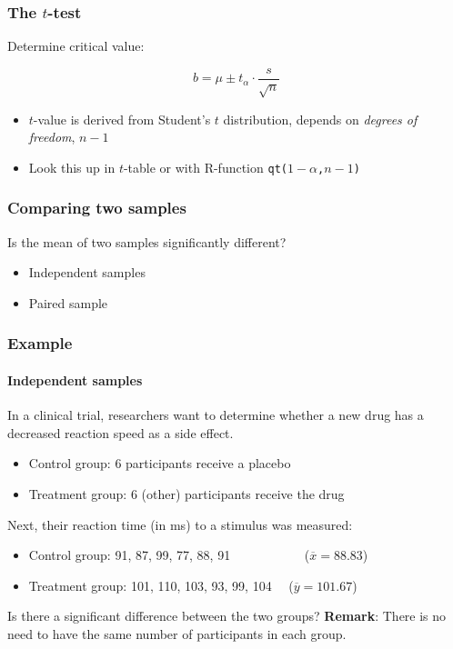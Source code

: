 \documentclass{beamer}
\begin{document}
\begin{frame}
  \frametitle{The $t$-test}
  
  Determine critical value:
  
  \[ b = \mu \pm t_\alpha \cdot \frac{s}{\sqrt{n}} \]
  
  \begin{itemize}
    \item $t$-value is derived from Student's $t$ distribution, depends on \emph{degrees of freedom}, $n-1$
    \item Look this up in $t$-table or with R-function \texttt{qt($1-\alpha$,$n-1$)}
  \end{itemize}
  
\end{frame}

\begin{frame}
  \frametitle{Comparing two samples}
  
  Is the mean of two samples significantly different?
  
  \begin{itemize}
    \item Independent samples
    \item Paired sample
  \end{itemize}
\end{frame}

\begin{frame}
  \frametitle{Example}
  \framesubtitle{Independent samples}
  
  In a clinical trial, researchers want to determine whether a new drug has a decreased reaction speed as a side effect.
  
  \begin{itemize}
    \item Control group: 6 participants receive a placebo
    \item Treatment group: 6 (other) participants receive the drug
  \end{itemize}
  
  Next, their reaction time (in ms) to a stimulus was measured:
  
  \begin{itemize}
    \item Control group: 91, 87, 99, 77, 88, 91 ~~~~~~~~~~~($\overline{x}=88.83$)
    \item Treatment group: 101, 110, 103, 93, 99, 104 ~~($\overline{y}=101.67$)
  \end{itemize}
  
  Is there a significant difference between the two groups?
\vfill
  \textbf{Remark}: There is no need to have the same number of participants in each group.
\end{frame}
\end{document}
